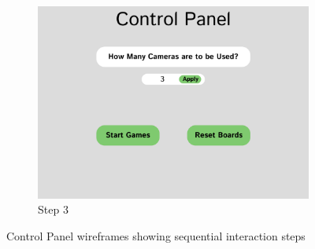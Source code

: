 \begin{figure}[h!]
    \begin{subfigure}[h!]{0.40\linewidth}
        \centering
        \includegraphics[width=\linewidth]{figures/methods/wireframes/control-panel-3.png}
        \caption{Step 3}
        \label{fig:control-panel-3}
    \end{subfigure}
    
    \caption{Control Panel wireframes showing sequential interaction steps}
    \label{fig:control-panel-group}
\end{figure}


